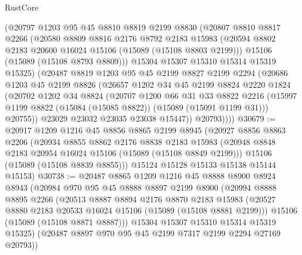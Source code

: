 \begin{lexlean}{RustCore}
\begin{coremodule}
        (@20797
          @1203
          @95
          @45
          @8810
          @8819
          @2199
          @8830
          (@20807
            @8810
            @8817
            @2266
            (@20580
              @8809
              @8816
              @2176
              @8792
              @2183
              @15983
              (@20594 @8802 @2183 @20600 @16024 @15106 (@15089 (@15108 @8803 @2199)))
              @15106
              (@15089 (@15108 @8793 @8809)))
            @15304
            @15307
            @15310
            @15314
            @15319
            @15325)
          (@20487
            @8819
            @1203
            @95
            @45
            @2199
            @8827
            @2199
            @2294
            (@20686
              @1203
              @45
              @2199
              @8826
              (@26657
                @1202
                @34
                @45
                @2199
                @8824
                @2220
                @1824
                (@20702
                  @1202
                  @34
                  @8824
                  (@20707
                    @1200
                    @66
                    @31
                    @33
                    @8822
                    @2216
                    (@15997 @1199 @8822 (@15084 (@15085 @8822)) (@15089 (@15091 @1199 @31)))
                    @20755))
                @23029
                @23032
                @23035
                @23038
                @15447))
            @20793))))
@30679 := @20917
    @1209
    @1216
    @45
    @8856
    @8865
    @2199
    @8945
    (@20927
      @8856
      @8863
      @2206
      (@20934
        @8855
        @8862
        @2176
        @8838
        @2183
        @15983
        (@20948 @8848 @2183 @20954 @16024 @15106 (@15089 (@15108 @8849 @2199)))
        @15106
        (@15089 (@15108 @8839 @8855)))
      @15124
      @15128
      @15133
      @15138
      @15144
      @15153)
@30738 := @20487
    @8865
    @1209
    @1216
    @45
    @8888
    @8900
    @8924
    @8943
    (@20984
      @970
      @95
      @45
      @8888
      @8897
      @2199
      @8900
      (@20994
        @8888
        @8895
        @2266
        (@20513
          @8887
          @8894
          @2176
          @8870
          @2183
          @15983
          (@20527 @8880 @2183 @20533 @16024 @15106 (@15089 (@15108 @8881 @2199)))
          @15106
          (@15089 (@15108 @8871 @8887)))
        @15304
        @15307
        @15310
        @15314
        @15319
        @15325)
      (@20487 @8897 @970 @95 @45 @2199 @7317 @2199 @2294 @27169 @20793))

\end{coremodule}
\end{lexlean}
